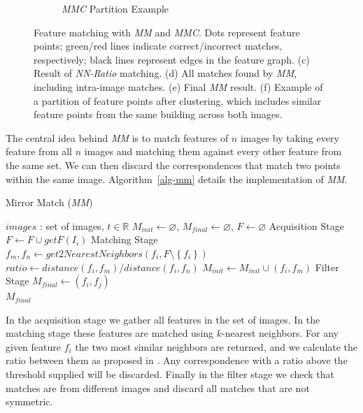 \documentclass[conference]{IEEEtran}
\begin{document}
\begin{figure}
\begin{subfigure}[t]{\columnwidth}
			\caption{\emph{MMC} Partition Example}
			\label{fig:pitts_partition}
		\end{subfigure}%
    \caption{Feature matching with \emph{MM} and \emph{MMC}. Dots 
        represent feature points; green/red lines indicate 
        correct/incorrect matches, respectively; black lines represent 
        edges in the feature graph.  (c) Result of \emph{NN-Ratio} 
        matching.  (d) All matches found by \emph{MM}, including 
        intra-image matches.  (e) Final \emph{MM} result.  (f) Example 
        of a partition of feature points after clustering, which 
        includes similar feature points from the same building across 
    both images.}%
	\label{fig:comparemirror}%
\end{figure}%

The central idea behind \emph{MM} is to match features of $n$ images by 
taking every feature from all $n$ images and matching them against every 
other feature from the same set. We can then discard the correspondences 
that match two points within the same image. Algorithm~\ref{alg-mm} 
details  the implementation of \emph{MM}.
%
\begin{algorithm}[htb]
\caption{Mirror Match (\emph{MM})}
\label{alg-mm}
\begin{algorithmic}
\Require $images$ : set of images, $t \in \mathbb{R}$
\State $M_{init}\gets \varnothing$, $M_{final}\gets 
\varnothing$, $F\gets \varnothing$
 \Comment Acquisition Stage
	\State $F\gets F \cup getF(I_i)$
\EndFor
{} \Comment Matching Stage
    \State $f_m,f_n \gets get2NearestNeighbors(f_i, F \setminus 
    \left\{f_i\right\})$
    \State $ratio \gets distance(f_i, f_m) / distance(f_i, f_n)$
		\State $M_{init} \gets M_{init} \cup \left(f_i, f_m\right)$
	\EndIf
\EndFor
{} \Comment Filter 
Stage
		\State $M_{final} \gets (f_i, f_j)$
	\EndIf
\EndFor \\
\Return $M_{final}$
\end{algorithmic}
\end{algorithm}
%
In the acquisition stage we gather all features in the set of images.  
In the matching stage these features are matched using $k$-nearest 
neighbors.  For any given feature $f_i$ the two most similar neighbors 
are returned, and we calculate the ratio between them as proposed in 
\cite{lowe2004sift}.  Any correspondence with a ratio above the 
threshold supplied will be discarded. Finally in the filter stage we 
check that matches are from different images and discard all matches 
that are not symmetric.
\end{document}
